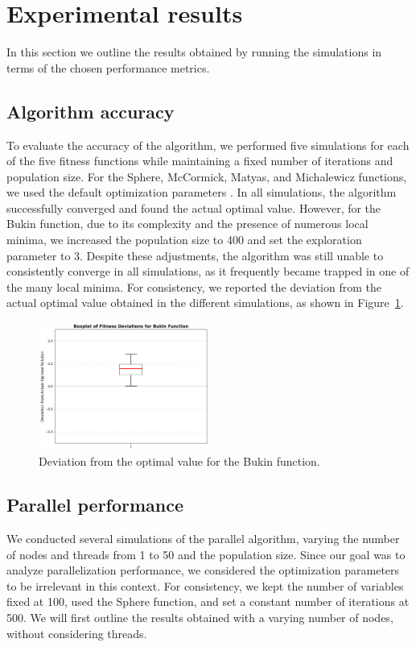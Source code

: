 \section{Experimental results}
In this section we outline the results obtained by running the simulations in terms of the chosen performance metrics.
\subsection{Algorithm accuracy}
To evaluate the accuracy of the algorithm, we performed five simulations for each of the five fitness functions while maintaining a fixed number of iterations and population size. For the Sphere, McCormick, Matyas, and Michalewicz functions, we used the default optimization parameters \cite{pepo}. In all simulations, the algorithm successfully converged and found the actual optimal value.  
\newline
However, for the Bukin function, due to its complexity and the presence of numerous local minima, we increased the population size to 400 and set the exploration parameter to 3. Despite these adjustments, the algorithm was still unable to consistently converge in all simulations, as it frequently became trapped in one of the many local minima.  
\newline
For consistency, we reported the deviation from the actual optimal value obtained in the different simulations, as shown in Figure~\ref{fig:bukin_deviation}.
\newline
\begin{figure}[h]
    \centering
    \includegraphics[width=0.5\textwidth]{figures/bukin_fitness_boxplot.png} %
    \caption{Deviation from the optimal value for the Bukin function.}
    \label{fig:bukin_deviation}
\end{figure}
\newline
\subsection{Parallel performance}
We conducted several simulations of the parallel algorithm, varying the number of nodes and threads from 1 to 50 and the population size. Since our goal was to analyze parallelization performance, we considered the optimization parameters to be irrelevant in this context.  
\newline
For consistency, we kept the number of variables fixed at 100, used the Sphere function, and set a constant number of iterations at 500. We will first outline the results obtained with a varying number of nodes, without considering threads.
